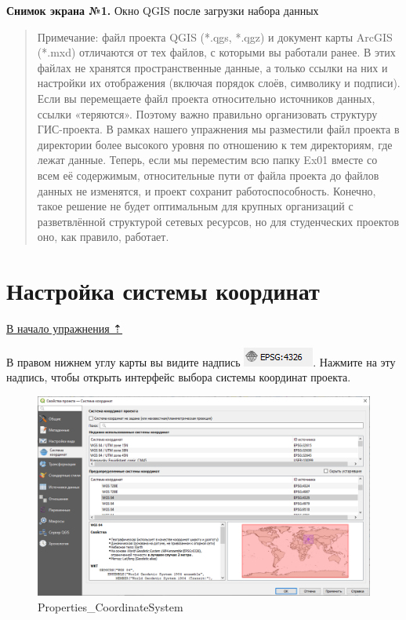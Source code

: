 \documentclass[
  12pt,
]{book}
\begin{document}
\textbf{Снимок экрана №1.} Окно QGIS после загрузки набора данных

\begin{quote}
Примечание: файл проекта QGIS (*.qgs, *.qgz) и документ карты ArcGIS (*.mxd) отличаются от тех файлов, с которыми вы работали ранее. В этих файлах не хранятся пространственные данные, а только ссылки на них и настройки их отображения (включая порядок слоёв, символику и подписи). Если вы перемещаете файл проекта относительно источников данных, ссылки «теряются». Поэтому важно правильно организовать структуру ГИС-проекта. В рамках нашего упражнения мы разместили файл проекта в директории более высокого уровня по отношению к тем директориям, где лежат данные. Теперь, если мы переместим всю папку Ex01 вместе со всем её содержимым, относительные пути от файла проекта до файлов данных не изменятся, и проект сохранит работоспособность. Конечно, такое решение не будет оптимальным для крупных организаций с разветвлённой структурой сетевых ресурсов, но для студенческих проектов оно, как правило, работает.
\end{quote}

\hypertarget{map-design-general-projection}{%
\section{Настройка системы координат}\label{map-design-general-projection}}

\protect\hyperlink{map-design-general}{В начало упражнения ⇡}

В правом нижнем углу карты вы видите надпись \includegraphics{images/Ex01/pic02.png}. Нажмите на эту надпись, чтобы открыть интерфейс выбора системы координат проекта.

\begin{figure}
\centering
\includegraphics{images/Ex01/Properties_CoordinateSystem.png}
\caption{Properties\_CoordinateSystem}
\end{figure}
\end{document}
